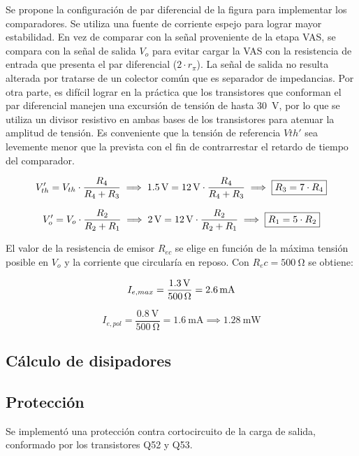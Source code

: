 	Se propone la configuración de par diferencial de la figura para implementar los comparadores. Se utiliza una fuente de corriente espejo para lograr mayor estabilidad. En vez de comparar con la señal proveniente de la etapa VAS, se compara con la señal de salida $V_{o}$ para evitar cargar la VAS con la resistencia de entrada que presenta el par diferencial ($2\cdot r_\pi$). La señal de salida no resulta alterada por tratarse de un colector común que es separador de impedancias.
	Por otra parte, es difícil lograr en la práctica que los transistores que conforman el par diferencial manejen una excursión de tensión de hasta \SI{30}{\volt}, por lo que se utiliza un divisor resistivo en ambas bases de los transistores para atenuar la amplitud de tensión. Es conveniente que la tensión de referencia $Vth'$ sea levemente menor que la prevista con el fin de contrarrestar el retardo de tiempo del comparador.

\begin{equation}
	\centering
	V_{th}' = V_{th} \cdot \frac{R_4}{R_4 + R_3} \implies \SI{1.5}{\volt} = \SI{12}{\volt} \cdot \frac{R_4}{R_4 + R_3} \implies \boxed{R_3 = 7 \cdot R_4}
\end{equation}

\begin{equation}
	\centering
	V_o' = V_o \cdot \frac{R_2}{R_2 + R_1} \implies \SI{2}{\volt} = \SI{12}{\volt} \cdot \frac{R_2}{R_2 + R_1} \implies \boxed{R_1 = 5 \cdot R_2}
	\end{equation}

	El valor de la resistencia de emisor $R_{ec}$ se elige en función de la máxima tensión posible en $V_o$ y la corriente que circularía en reposo. Con $R_ec = \SI{500}{\ohm}$ se obtiene:

	\begin{equation}
		\centering
		I_{e,max} = \frac{ \SI{1.3}{\volt} }{ \SI{500}{\ohm} } = \SI{2.6}{\milli\ampere}
	\end{equation}

	\begin{equation}
		I_{e,pol} = \frac{ \SI{0.8}{\volt} }{ \SI{500}{\ohm} } = \SI{1.6}{\milli\ampere} \implies \SI{1.28}{\milli\watt}
	\end{equation}
	
	\subsection{Cálculo de disipadores}
	
	
	\subsection{Protección}
	Se implementó una protección contra cortocircuito de la carga de salida, conformado por los transistores Q52 y Q53.

